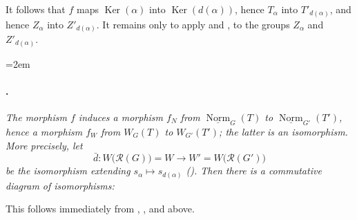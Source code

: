It follows that \(f\) maps \(\operatorname{Ker}(\alpha)\) into
\(\operatorname{Ker}(d(\alpha))\), hence \(T_\alpha\) into
\(T'_{d(\alpha)}\), and hence \(Z_\alpha\) into
\(Z'_{d(\alpha)}\). It remains only to apply  and
, to the groups \(Z_\alpha\) and \(Z'_{d(\alpha)}\).

\begingroup
\emergencystretch=2em
\paragraph{.}
\textit{The morphism \(f\) induces a morphism \(f_N\) from
\(\underline{\operatorname{Norm}}_G(T)\) to
\(\underline{\operatorname{Norm}}_{G'}(T')\), hence a morphism
\(f_W\) from \(W_G(T)\) to \(W_{G'}(T')\); the latter is an
isomorphism. More precisely, let}
\[
  \bar d:W\bigl(\mathscr R(G)\bigr)=W
  \longrightarrow
  W'=W\bigl(\mathscr R(G')\bigr)
\]
\textit{be the isomorphism extending
\(s_\alpha\mapsto s_{d(\alpha)}\) \textup{()}.
Then there is a commutative diagram of isomorphisms:}
\endgroup

\begin{center}


\end{center}

This follows immediately from , , and
\textup{} above.

